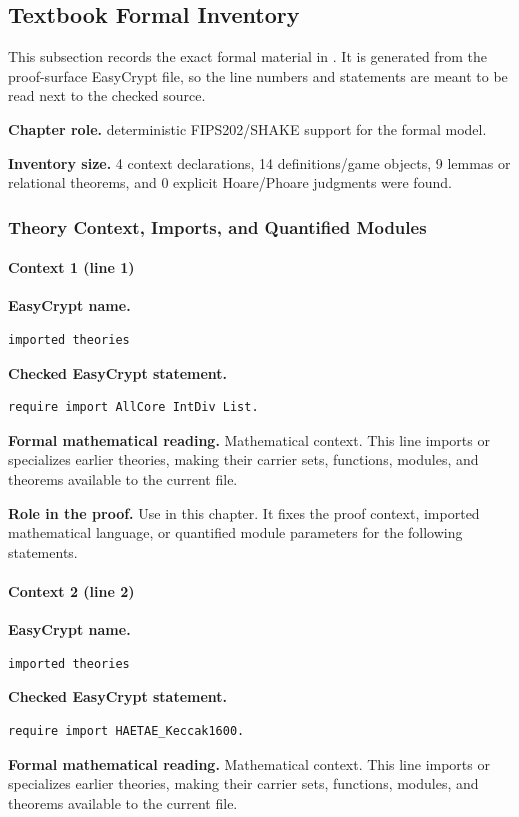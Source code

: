\subsection*{Textbook Formal Inventory}
This subsection records the exact formal material in .  It is generated from the proof-surface EasyCrypt file, so the line numbers and statements are meant to be read next to the checked source.

\noindent\textbf{Chapter role.} deterministic FIPS202/SHAKE support for the formal model.

\noindent\textbf{Inventory size.} 4 context declarations, 14 definitions/game objects, 9 lemmas or relational theorems, and 0 explicit Hoare/Phoare judgments were found.

\subsubsection*{Theory Context, Imports, and Quantified Modules}
\paragraph{Context 1 (line 1)}
\noindent\textbf{EasyCrypt name.}
\begin{lstlisting}[language=EasyCrypt,basicstyle=\ttfamily\scriptsize]
imported theories
\end{lstlisting}
\noindent\textbf{Checked EasyCrypt statement.}
\begin{lstlisting}[language=EasyCrypt,basicstyle=\ttfamily\scriptsize]
require import AllCore IntDiv List.
\end{lstlisting}
\noindent\textbf{Formal mathematical reading.}
Mathematical context. This line imports or specializes earlier theories, making their carrier sets, functions, modules, and theorems available to the current file.

\noindent\textbf{Role in the proof.}
Use in this chapter. It fixes the proof context, imported mathematical language, or quantified module parameters for the following statements.

\paragraph{Context 2 (line 2)}
\noindent\textbf{EasyCrypt name.}
\begin{lstlisting}[language=EasyCrypt,basicstyle=\ttfamily\scriptsize]
imported theories
\end{lstlisting}
\noindent\textbf{Checked EasyCrypt statement.}
\begin{lstlisting}[language=EasyCrypt,basicstyle=\ttfamily\scriptsize]
require import HAETAE_Keccak1600.
\end{lstlisting}
\noindent\textbf{Formal mathematical reading.}
Mathematical context. This line imports or specializes earlier theories, making their carrier sets, functions, modules, and theorems available to the current file.

